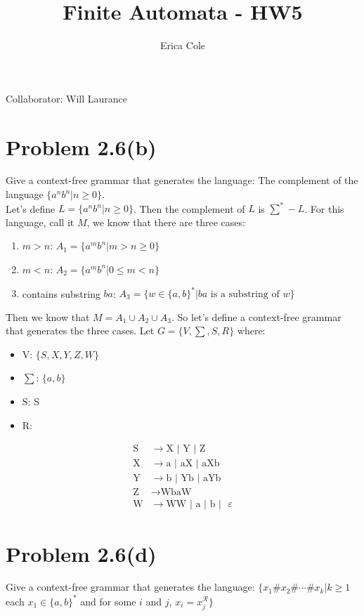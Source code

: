\documentclass{article}
\title{\bf Finite Automata - HW5}
\author{Erica Cole}
\begin{document}
\maketitle
\begin{center}
 Collaborator: Will Laurance
\end{center}

\section*{Problem 2.6(b)}
Give a context-free grammar that generates the language: The complement of the language $\{a^nb^n|n \geq 0 \}$.\\

Let's define $L = \{a^nb^n|n \geq 0 \}$.  Then the complement of $L$ is $\sum^* - L$.  For this language, call it $M$, we know that 
there are three cases:
  \begin{enumerate}
   \item $m>n$: $A_1 = \{a^mb^n |m > n \geq 0 \}$
   \item $m<n$: $A_2 = \{a^mb^n |0 \leq m < n \}$
   \item contains substring $ba$: $A_3 = \{w \in \{a,b\}^*| ba \text{ is a substring of }w \}$
  \end{enumerate}

Then we know that $M = A_1 \cup A_2 \cup A_3$.  So let's define a context-free grammar that generates the three cases.  Let 
$G = \{V, \sum, S, R \}$ where:
  \begin{itemize}
   \item V: $\{S,X,Y,Z,W \}$
   \item $\sum$: $\{a,b \}$
   \item S: S
   \item R:
  \end{itemize}
  \begin{align*}
   \text{S} &\rightarrow \text{X }|\text{ Y }|\text{ Z}\\
   \text{X} &\rightarrow \text{a }|\text{ aX }|\text{ aXb}\\
   \text{Y} &\rightarrow \text{b }|\text{ Yb }|\text{ aYb}\\
   \text{Z} &\rightarrow \text{WbaW}\\
   \text{W} &\rightarrow \text{WW }|\text{ a }|\text{ b }|\text{ }\varepsilon
  \end{align*}


\section*{Problem 2.6(d)}
Give a context-free grammar that generates the language: $\{x_1\#x_2\#\cdots \#x_k|k \geq 1$ each $x_1 \in \{a,b\}^*$ and for 
some $i$ and $j$, $x_i = x_j^\mathcal{R}\}$\\
\end{document}
